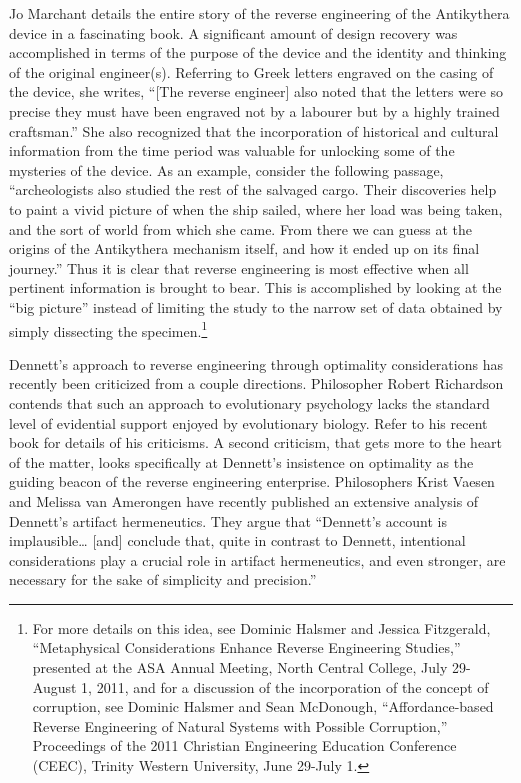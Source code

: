 Jo Marchant details the entire story of the reverse engineering of the
Antikythera device in a fascinating book.\citep{marchant2009} A
significant amount of design recovery was accomplished in terms of the
purpose of the device and the identity and thinking of the original
engineer(s). Referring to Greek letters engraved on the casing of the
device, she writes, “[The reverse engineer] also noted that the letters
were so precise they must have been engraved not by a labourer but by a
highly trained craftsman.”\citep[][pg. 55]{marchant2009} She also recognized that
the incorporation of historical and cultural information from the time
period was valuable for unlocking some of the mysteries of the device.
As an example, consider the following passage, “archeologists also
studied the rest of the salvaged cargo. Their discoveries help to paint
a vivid picture of when the ship sailed, where her load was being
taken, and the sort of world from which she came. From there we can
guess at the origins of the Antikythera mechanism itself, and how it
ended up on its final journey.”\citep[][pg. 61]{marchant2009} Thus it is clear
that reverse engineering is most effective when all pertinent
information is brought to bear. This is accomplished by looking at the
“big picture” instead of limiting the study to the narrow set of data
obtained by simply dissecting the specimen.\footnote{
For more details on this idea, see Dominic Halsmer
and Jessica Fitzgerald, ``Metaphysical Considerations Enhance Reverse
Engineering Studies,'' presented at the ASA Annual Meeting, North
Central College, July 29-August 1, 2011, and for a discussion of the
incorporation of the concept of corruption, see Dominic Halsmer and
Sean McDonough, ``Affordance-based Reverse Engineering of Natural
Systems with Possible Corruption,'' Proceedings of the 2011 Christian
Engineering Education Conference (CEEC), Trinity Western University,
June 29-July 1.
}

Dennett’s approach to reverse engineering through optimality
considerations has recently been criticized from a couple directions.
Philosopher Robert Richardson contends that such an approach to
evolutionary psychology lacks the standard level of evidential support
enjoyed by evolutionary biology. Refer to his recent
book\citep{richardson2007} for details of his criticisms. A second
criticism, that gets more to the heart of the matter, looks
specifically at Dennett’s insistence on optimality as the guiding
beacon of the reverse engineering enterprise. Philosophers Krist Vaesen
and Melissa van Amerongen have recently published an extensive analysis
of Dennett’s artifact hermeneutics. They argue that “Dennett’s account
is implausible{\ldots} [and] conclude that, quite in contrast to Dennett,
intentional considerations play a crucial role in artifact
hermeneutics, and even stronger, are necessary for the sake of
simplicity and precision.”\citep[][pg. 779]{vaesenamerongen2008}

